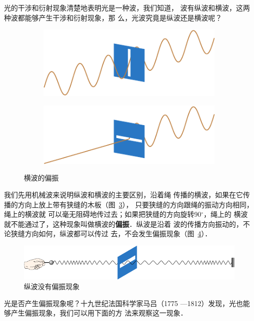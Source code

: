 光的干涉和衍射现象清楚地表明光是一种波，我们知道，
波有纵波和横波，这两种波都能够产生干涉和衍射现象，那
么，光波究竟是纵波还是横波呢？
\begin{figure}[htbp]
    \centering
    \begin{subfigure}{0.45\linewidth}
        \centering
        \includegraphics{fig/C/6-11a.pdf}
        \caption{}\label{fig_C_6-11a}
    \end{subfigure}
    \hfil
    \begin{subfigure}{0.45\linewidth}
        \centering
        \includegraphics{fig/C/6-11b.pdf}
        \caption{}\label{fig_C_6-11b}
    \end{subfigure}
    \caption{横波的偏振}\label{fig_C_6-11}
\end{figure}

我们先用机械波来说明纵波和横波的主要区别，沿着绳
传播的横波，如果在它传播的方向上放上带有狭缝的木板（图~\ref{fig_C_6-11}），
只要狭缝的方向跟绳的振动方向相同，绳上的横波就
可以毫无阻碍地传过去；如果把狭缝的方向旋转90$^\circ$，绳上的
横波就不能通过了，这种现象叫做横波的\textbf{偏振}．纵波是沿着
波的传播方向振动的，不论狭缝方向如何，纵波都可以传过
去，不会发生偏振现象（图~\ref{fig_C_6-12}）．
\begin{figure}[htbp]
    \centering
    \includegraphics{fig/C/6-12.pdf}
    \caption{纵波没有偏振现象}\label{fig_C_6-12}
\end{figure}

光是否产生偏振现象呢？十九世纪法国科学家马吕（1775
—1812）发现，光也能够产生偏振现象，我们可以用下面的方
法来观察这一现象．

